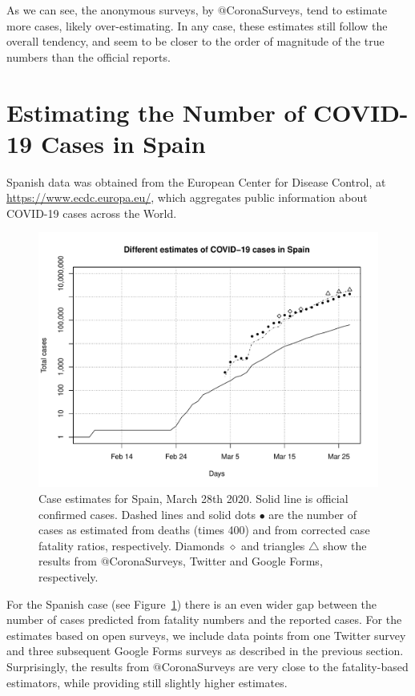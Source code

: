\documentclass{article}
\begin{document}
As we can see, the anonymous surveys, by $@$CoronaSurveys, tend to estimate more cases, likely over-estimating. In any case, these estimates still follow the overall tendency, and seem to be closer to the order of magnitude of the true numbers than the official reports. 

\section{Estimating the Number of COVID-19 Cases in Spain}

Spanish data was obtained from the European Center for Disease Control, at \url{https://www.ecdc.europa.eu/}, which aggregates public information about COVID-19 cases across the World. 

\begin{figure}
\begin{center}
\includegraphics[width=0.9\linewidth]{EstSPMar28.pdf}
\end{center}
\caption{Case estimates for Spain, March 28th 2020. Solid line is official confirmed cases. Dashed lines and solid dots $\bullet$ are the number of cases as estimated from deaths (times 400) and from corrected case fatality ratios, respectively. Diamonds $\diamond$ and triangles  $\triangle$ show the results from $@$CoronaSurveys, Twitter and Google Forms, respectively.}
\label{sp}
\end{figure}

For the Spanish case (see Figure~\ref{sp}) there is an even wider gap between the number of cases predicted from fatality numbers and the reported cases. For the estimates based on open surveys, we include data points from one Twitter survey and three subsequent Google Forms surveys as described in the previous section. Surprisingly, the results from $@$CoronaSurveys are very close to the fatality-based estimators, while providing still slightly higher estimates. 
\end{document}
